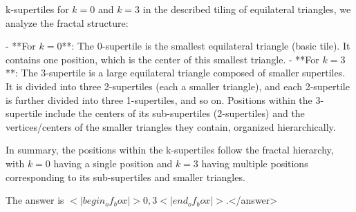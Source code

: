 k-supertiles for \( k = 0 \) and \( k = 3 \) in the described tiling of equilateral triangles, we analyze the fractal structure:  

- **For \( k = 0 \)**: The 0-supertile is the smallest equilateral triangle (basic tile). It contains one position, which is the center of this smallest triangle.  
- **For \( k = 3 \)**: The 3-supertile is a large equilateral triangle composed of smaller supertiles. It is divided into three 2-supertiles (each a smaller triangle), and each 2-supertile is further divided into three 1-supertiles, and so on. Positions within the 3-supertile include the centers of its sub-supertiles (2-supertiles) and the vertices/centers of the smaller triangles they contain, organized hierarchically.  

In summary, the positions within the k-supertiles follow the fractal hierarchy, with \( k = 0 \) having a single position and \( k = 3 \) having multiple positions corresponding to its sub-supertiles and smaller triangles.  

The answer is \(<|begin_of_box|>0, 3<|end_of_box|>\).</answer>